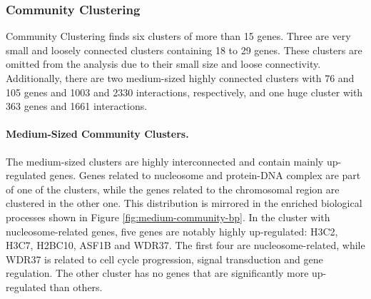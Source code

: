 \subsubsection{Community Clustering}

Community Clustering finds six clusters of more than 15 genes. Three are very small and loosely connected clusters containing 18 to 29 genes. These clusters are omitted from the analysis due to their small size and loose connectivity. Additionally, there are two medium-sized highly connected clusters with 76 and 105 genes and 1003 and 2330 interactions, respectively, and one huge cluster with 363 genes and 1661 interactions.

\paragraph{Medium-Sized Community Clusters.}
The medium-sized clusters are highly interconnected and contain mainly up-regulated genes. Genes related to nucleosome and protein-DNA complex are part of one of the clusters, while the genes related to the chromosomal region are clustered in the other one. This distribution is mirrored in the enriched biological processes shown in Figure \ref{fig:medium-community-bp}. In the cluster with nucleosome-related genes, five genes are notably highly up-regulated: H3C2, H3C7, H2BC10, ASF1B and WDR37. The first four are nucleosome-related, while WDR37 is related to cell cycle progression, signal transduction and gene regulation. The other cluster has no genes that are significantly more up-regulated than others.

